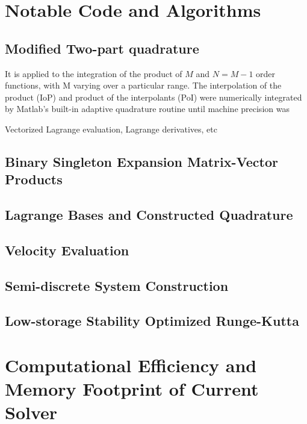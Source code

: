 \documentclass[letterpaper,12pt]{report}
\begin{document}
\cleardoublepage
\appendix
{}
%
\chapter{Notable Code and Algorithms}\label{Algs}
\section{Modified Two-part quadrature}

It is applied to the integration of the product of $M$ and $N=M-1$ order functions, with M varying over a particular range. The interpolation of the product (IoP) and product of the interpolants (PoI) were numerically integrated by Matlab's built-in adaptive quadrature routine until machine precision was 

Vectorized Lagrange evaluation, Lagrange derivatives, etc
\newpage
\section{Binary Singleton Expansion Matrix-Vector Products}
\newpage
\section{Lagrange Bases and Constructed Quadrature}
\newpage
\section{Velocity Evaluation}
\section{Semi-discrete System Construction}
\newpage
\section{Low-storage Stability Optimized Runge-Kutta}
%
\chapter{Computational Efficiency and Memory Footprint of Current Solver}\label{Algs}

\end{document}
